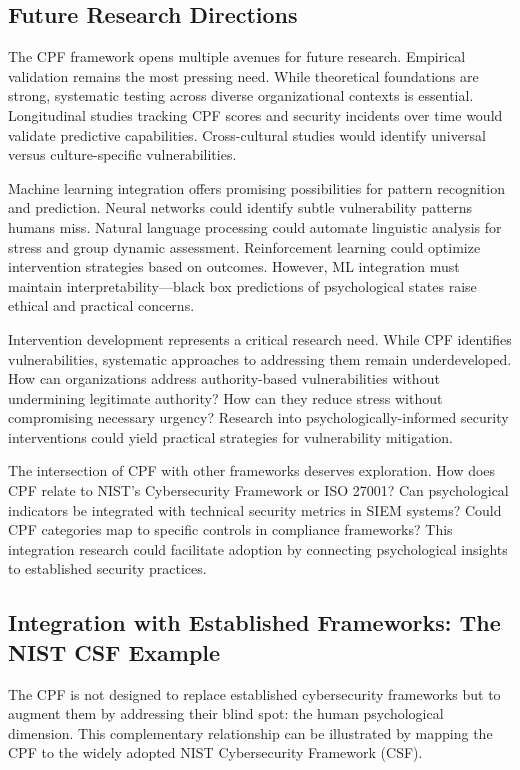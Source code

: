 \documentclass[manuscript,screen,review]{acmart}
\begin{document}
\subsection{Future Research Directions}

The CPF framework opens multiple avenues for future research. Empirical validation remains the most pressing need. While theoretical foundations are strong, systematic testing across diverse organizational contexts is essential. Longitudinal studies tracking CPF scores and security incidents over time would validate predictive capabilities. Cross-cultural studies would identify universal versus culture-specific vulnerabilities.

Machine learning integration offers promising possibilities for pattern recognition and prediction. Neural networks could identify subtle vulnerability patterns humans miss. Natural language processing could automate linguistic analysis for stress and group dynamic assessment. Reinforcement learning could optimize intervention strategies based on outcomes. However, ML integration must maintain interpretability—black box predictions of psychological states raise ethical and practical concerns.

Intervention development represents a critical research need. While CPF identifies vulnerabilities, systematic approaches to addressing them remain underdeveloped. How can organizations address authority-based vulnerabilities without undermining legitimate authority? How can they reduce stress without compromising necessary urgency? Research into psychologically-informed security interventions could yield practical strategies for vulnerability mitigation.

The intersection of CPF with other frameworks deserves exploration. How does CPF relate to NIST's Cybersecurity Framework or ISO 27001? Can psychological indicators be integrated with technical security metrics in SIEM systems? Could CPF categories map to specific controls in compliance frameworks? This integration research could facilitate adoption by connecting psychological insights to established security practices.

\subsection{Integration with Established Frameworks: The NIST CSF Example}

The CPF is not designed to replace established cybersecurity frameworks but to augment them by addressing their blind spot: the human psychological dimension. This complementary relationship can be illustrated by mapping the CPF to the widely adopted NIST Cybersecurity Framework (CSF).
\end{document}

